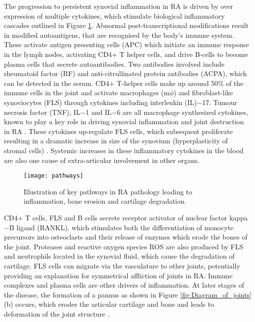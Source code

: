 \documentclass[twoside]{bhamthesis}
\theoremstyle{definition}
\begin{document}
The progression to persistent synovial inflammation in RA is driven by over expression of multiple cytokines, which stimulate biological inflammatory cascades outlined in Figure \ref{fig:pathways}. Abnormal post-transcriptional modifications result in modified autoantigens, that are recognised by the body's immune system. These activate antigen presenting cells (APC) which initiate an immune response in the lymph nodes, activating CD4+ T helper cells, and drive B-cells to become plasma cells that secrete autoantibodies. Two antibodies involved include rheumatoid factor (RF) and anti-citrullinated protein antibodies (ACPA), which can be detected in the serum. CD4+ T-helper cells make up around 50\% of the immune cells in the joint and activate macrophages (m$\phi$) and fibroblast-like synoviocytes (FLS) through cytokines including interleukin (IL)$-$17. Tumour necrosis factor (TNF), IL$-$1 and IL$-$6 are all macrophage synthesized cytokines, known to play a key role in driving synovial inflammation and joint destruction in RA \cite{scott2010RA}. These cytokines up-regulate FLS cells, which subsequent proliferate resulting in a dramatic increase in size of the synovium (hyperplasticity of stromal cells) \cite{bartok2010fibroblast}. Systemic increases in these inflammatory cytokines in the blood are also one cause of extra-articular involvement in other organs. 
\begin{figure}[!ht]
\centering\texttt{[image: pathways]}
\caption{Illustration of key pathways in RA pathology leading to inflammation, bone erosion and cartilage degradation.}
\label{fig:pathways}
\end{figure}

CD4+ T cells, FLS and B cells secrete receptor activator of nuclear factor kappa$-$B ligand (RANKL), which stimulates both the differentiation of monocyte precursors into osteoclasts and their release of enzymes which erode the bones of the joint. Proteases and reactive oxygen species ROS are also produced by FLS and neutrophils located in the synovial fluid, which cause the degradation of cartilage. FLS cells can migrate via the vasculature to other joints, potentially providing an explanation for symmetrical affliction of joints in RA. Immune complexes and plasma cells are other drivers of inflammation. At later stages of the disease, the formation of a pannus as shown in Figure \ref{fig:Diagram_of_joints}(b) occurs, which erodes the articular cartilage and bone and leads to deformation of the joint structure \cite{scott1986long}.
\end{document}
